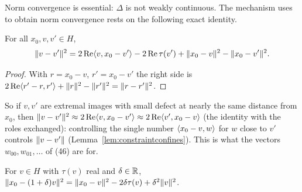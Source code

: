 Norm convergence is essential: $\Delta$ is not weakly continuous. The mechanism \paper{} uses to
obtain norm convergence rests on the following exact identity.

\begin{lemma}[Confinement]\label{lem:confinement}
\stproved{} 
For all $x_0,v,v'\in H$,
\[
\lVert v-v'\rVert^2=2\operatorname{Re}\langle v,x_0-v'\rangle-2\operatorname{Re}\tau(v')+\lVert x_0-v\rVert^2-\lVert x_0-v'\rVert^2 .
\]
\end{lemma}
\begin{proof}
With $r=x_0-v$, $r'=x_0-v'$ the right side is
$2\operatorname{Re}\langle r'-r,r'\rangle+\lVert r\rVert^2-\lVert r'\rVert^2=\lVert r-r'\rVert^2$.
\end{proof}

So if $v,v'$ are extremal images with small defect at nearly the same distance from $x_0$,
then $\lVert v-v'\rVert^2\approx2\operatorname{Re}\langle v,x_0-v'\rangle\approx2\operatorname{Re}\langle v',x_0-v\rangle$ (the identity with the
roles exchanged): controlling the single number $\langle x_0-v,w\rangle$ for $w$ close to $v'$ controls
$\lVert v-v'\rVert$ (Lemma~\ref{lem:constraintconfines}). This is what the vectors
$w_{00},w_{01},\dots$ of \paper{} (46) are for.

\begin{lemma}[Scaling]\label{lem:scaling}\stproved{}
For $v\in H$ with $\tau(v)$ real and $\delta\in\mathbb{R}$,
$\lVert x_0-(1+\delta)v\rVert^2=\lVert x_0-v\rVert^2-2\delta\tau(v)+\delta^2\lVert v\rVert^2$.
\end{lemma}
